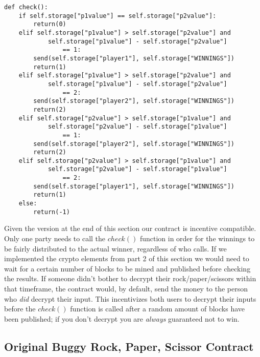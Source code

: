 \documentclass[12pt]{article}
\begin{document}
\begin{lstlisting}[frame=single]
def check():
	if self.storage["p1value"] == self.storage["p2value"]:
		return(0)
	elif self.storage["p1value"] > self.storage["p2value"] and 
			self.storage["p1value"] - self.storage["p2value"] 
				== 1:
		send(self.storage["player1"], self.storage["WINNINGS"]) 
		return(1)
	elif self.storage["p1value"] > self.storage["p2value"] and 
			self.storage["p1value"] - self.storage["p2value"] 
				== 2:
		send(self.storage["player2"], self.storage["WINNINGS"])
		return(2)
	elif self.storage["p2value"] > self.storage["p1value"] and 
			self.storage["p2value"] - self.storage["p1value"] 
				== 1:
		send(self.storage["player2"], self.storage["WINNINGS"])		
		return(2)
	elif self.storage["p2value"] > self.storage["p1value"] and 
			self.storage["p2value"] - self.storage["p1value"] 
				== 2:
		send(self.storage["player1"], self.storage["WINNINGS"])		
		return(1)
	else:
		return(-1)
\end{lstlisting}

Given the version at the end of this section our contract is incentive compatible. Only one party needs to call the $check()$ function in order for the winnings to be fairly distributed to the actual winner, regardless of who calls. If we implemented the crypto elements from part 2 of this section we would need to wait for a certain number of blocks to be mined and published before checking the results. If someone didn’t bother to decrypt their rock/paper/scissors within that timeframe, the contract would, by default, send the money to the person who \textit{did} decrypt their input. This incentivizes both users to decrypt their inputs before the $check()$ function is called after a random amount of blocks have been published; if you don't decrypt you are \textit{always} guaranteed not to win.

\subsection{Original Buggy Rock, Paper, Scissor Contract}
\end{document}
